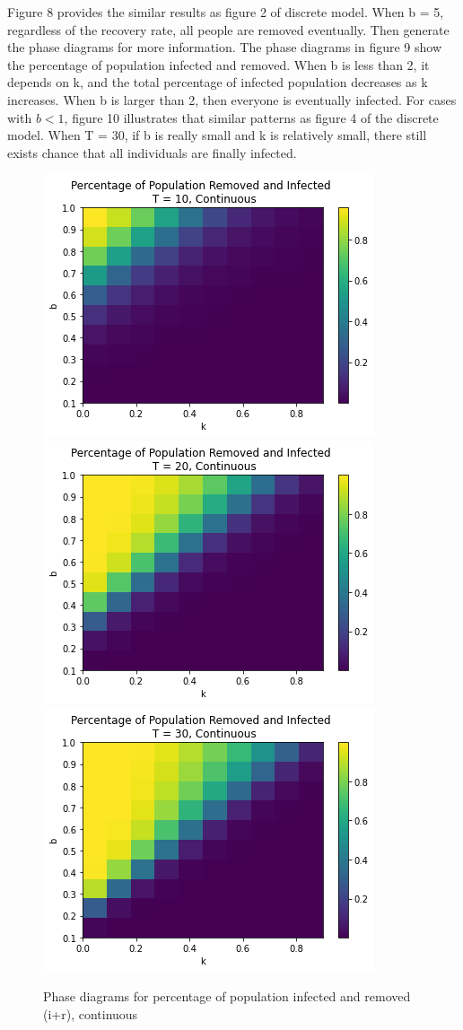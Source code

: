 \documentclass{article}
\begin{document}
Figure 8 provides the similar results as figure 2 of discrete model. When b = 5, regardless of the recovery rate, all people are removed eventually. Then generate the phase diagrams for more information.
The phase diagrams in figure 9 show the percentage of population infected and removed. When b is less than 2, it depends on k, and the total percentage of infected population decreases as k increases. When b is larger than 2, then everyone is eventually infected. For cases with $b < 1$, figure 10 illustrates that similar patterns as figure 4 of the discrete model. When T = 30, if b is really small and k is relatively small, there still exists chance that all individuals are finally infected.





\begin{figure}[htp]

\centering
\includegraphics[width=.3\textwidth]{Figure2_ode_totalT10_bsmall.png}\hfill
\includegraphics[width=.3\textwidth]{Figure2_ode_totalT20_bsmall.png}\hfill
\includegraphics[width=.3\textwidth]{Figure2_ode_totalT30_bsmall.png}

\caption{Phase diagrams for percentage of population infected and removed (i+r), continuous}
\label{fig:figure3}

\end{figure}
\end{document}
